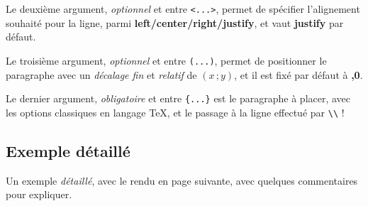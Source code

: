 \documentclass[a4paper]{article}
\newcommand\Cle[1]{{\bfseries\sffamily\textlangle #1\textrangle}}
\begin{document}
Le deuxième argument, \textit{optionnel} et entre \texttt{<...>}, permet de spécifier l'alignement souhaité pour la ligne, parmi \Cle{left/center/right/justify}, et vaut \Cle{justify} par défaut.

\smallskip

Le troisième argument, \textit{optionnel} et entre \texttt{(...)}, permet de positionner le paragraphe avec un \textit{décalage fin} et \textit{relatif} de $(x\,;y)$, et il est fixé par défaut à \Cle{0,0}.

\smallskip

Le dernier argument, \textit{obligatoire} et entre \texttt{\{...\}} est le paragraphe à placer, avec les options classiques en langage \TeX{}, et le passage à la ligne effectué par \texttt{\textbackslash\textbackslash} !

\subsection{Exemple \og détaillé \fg}

Un exemple \textit{détaillé}, avec le rendu en page suivante, avec quelques commentaires pour expliquer.
\end{document}

